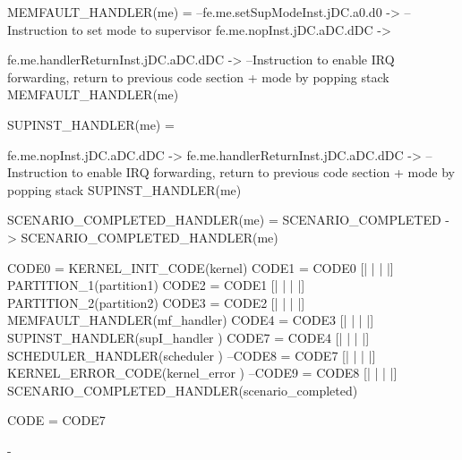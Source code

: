 {MEMFAULT_HANDLER(me) =
--fe.me.setSupModeInst.jDC.a0.d0 ->    --Instruction to set mode to supervisor
fe.me.nopInst.jDC.aDC.dDC ->

fe.me.handlerReturnInst.jDC.aDC.dDC ->    --Instruction to enable IRQ forwarding, return to previous code section + mode by popping stack
MEMFAULT_HANDLER(me)




SUPINST_HANDLER(me) =

fe.me.nopInst.jDC.aDC.dDC ->
fe.me.handlerReturnInst.jDC.aDC.dDC ->    --Instruction to enable IRQ forwarding, return to previous code section + mode by popping stack
SUPINST_HANDLER(me)







SCENARIO_COMPLETED_HANDLER(me) =
SCENARIO_COMPLETED ->
SCENARIO_COMPLETED_HANDLER(me)

CODE0 =  KERNEL_INIT_CODE(kernel)
CODE1 = CODE0 [| {|   |} |] PARTITION_1(partition1)
CODE2 = CODE1 [| {|   |} |] PARTITION_2(partition2)
CODE3 = CODE2 [| {|   |} |] MEMFAULT_HANDLER(mf_handler)
CODE4 = CODE3 [| {|   |} |] SUPINST_HANDLER(supI_handler )
CODE7 = CODE4 [| {|   |} |] SCHEDULER_HANDLER(scheduler )
--CODE8 = CODE7 [| {|   |} |] KERNEL_ERROR_CODE(kernel_error )
--CODE9 = CODE8 [| {|  |} |] SCENARIO_COMPLETED_HANDLER(scenario_completed)

CODE = CODE7


-}
